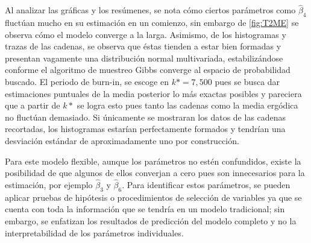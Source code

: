 \documentclass[../Main/Main.tex]{subfiles}
\begin{document}
Al analizar las gráficas y los resúmenes, se nota cómo ciertos parámetros como $\hat{\beta}_4$ fluctúan mucho en su estimación en un comienzo, sin embargo de \ref{fig:T2ME} se observa cómo el modelo converge a la larga. Asimismo, de los histogramas y trazas de las cadenas, se observa que éstas tienden a estar bien formadas y presentan vagamente una distribución normal multivariada, estabilizándose conforme el algoritmo de muestreo Gibbs converge al espacio de probabilidad buscado. El periodo de burn-in, se escoge en $k* = 7,500$ pues se busca dar estimaciones puntuales de la media posterior lo más exactas posibles y pareciera que a partir de $k*$ se logra esto pues tanto las cadenas como la media ergódica no fluctúan demasiado. Si únicamente se mostraran los datos de las cadenas recortadas, los histogramas estarían perfectamente formados y tendrían una desviación estándar de aproximadamente uno por construcción.

Para este modelo flexible, aunque los parámetros no estén confundidos, existe la posibilidad de que algunos de ellos converjan a cero pues son innecesarios para la estimación, por ejemplo $\hat{\beta}_3$ y $\hat{\beta}_6$. Para identificar estos parámetros, se pueden aplicar pruebas de hipótesis o procedimientos de selección de variables ya que se cuenta con toda la información que se tendría en un modelo tradicional; sin embargo, se enfatizan los resultados de predicción del modelo completo y no la interpretabilidad de los parámetros individuales.
\end{document}

